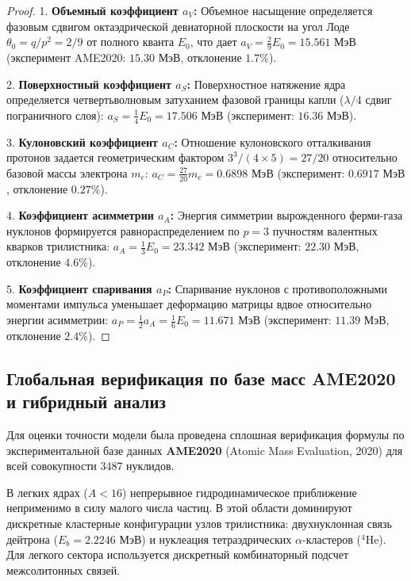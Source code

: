 \documentclass[11pt,a4paper]{article}
\theoremstyle{definition}
\theoremstyle{remark}
\begin{document}
\begin{proof}
1. \textbf{Объемный коэффициент $a_V$:} Объемное насыщение определяется фазовым сдвигом октаэдрической девиаторной плоскости на угол Лоде $\theta_0 = q/p^2 = 2/9$ от полного кванта $E_0$, что дает $a_V = \frac{2}{9} E_0 = 15.561\text{ МэВ}$ (эксперимент AME2020: $15.30\text{ МэВ}$, отклонение $1.7\%$).

2. \textbf{Поверхностный коэффициент $a_S$:} Поверхностное натяжение ядра определяется четвертьволновым затуханием фазовой границы капли ($\lambda/4$ сдвиг пограничного слоя): $a_S = \frac{1}{4} E_0 = 17.506\text{ МэВ}$ (эксперимент: $16.36\text{ МэВ}$).

3. \textbf{Кулоновский коэффициент $a_C$:} Отношение кулоновского отталкивания протонов задается геометрическим фактором $3^3 / (4 \times 5) = 27/20$ относительно базовой массы электрона $m_e$: $a_C = \frac{27}{20} m_e = 0.6898\text{ МэВ}$ (эксперимент: $0.6917\text{ МэВ}$, отклонение $0.27\%$).

4. \textbf{Коэффициент асимметрии $a_A$:} Энергия симметрии вырожденного ферми-газа нуклонов формируется равнораспределением по $p=3$ пучностям валентных кварков трилистника: $a_A = \frac{1}{3} E_0 = 23.342\text{ МэВ}$ (эксперимент: $22.30\text{ МэВ}$, отклонение $4.6\%$).

5. \textbf{Коэффициент спаривания $a_P$:} Спаривание нуклонов с противоположными моментами импульса уменьшает деформацию матрицы вдвое относительно энергии асимметрии: $a_P = \frac{1}{2} a_A = \frac{1}{6} E_0 = 11.671\text{ МэВ}$ (эксперимент: $11.39\text{ МэВ}$, отклонение $2.4\%$).
\end{proof}

\subsection{Глобальная верификация по базе масс AME2020 и гибридный анализ}
Для оценки точности модели была проведена сплошная верификация формулы по 
экспериментальной базе данных \textbf{AME2020} (Atomic Mass Evaluation, 2020) 
для всей совокупности 3487 нуклидов.

В легких ядрах ($A < 16$) непрерывное гидродинамическое приближение неприменимо 
в силу малого числа частиц. В этой области доминируют дискретные кластерные 
конфигурации узлов трилистника: двухнуклонная связь дейтрона ($E_b = 2.2246\text{ МэВ}$) 
и нуклеация тетраэдрических $\alpha$-кластеров ($^4\mathrm{He}$). Для легкого сектора 
используется дискретный комбинаторный подсчет межсолитонных связей.
\end{document}
